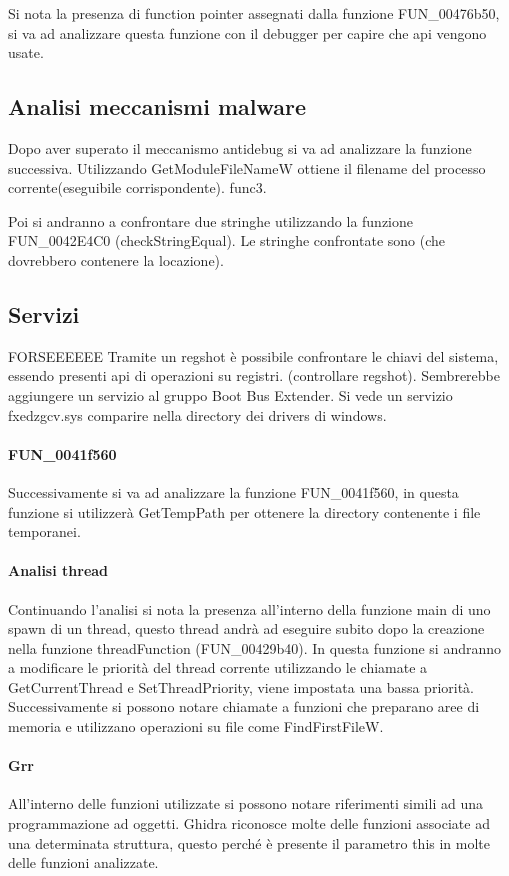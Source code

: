 \documentclass[]{article}
\begin{document}
Si nota la presenza di function pointer assegnati dalla funzione FUN\_00476b50, si va ad analizzare questa funzione con il debugger per capire che api vengono usate. 


\subsection{Analisi meccanismi malware}
Dopo aver superato il meccanismo antidebug si va ad analizzare la funzione successiva. Utilizzando GetModuleFileNameW ottiene il filename del processo corrente(eseguibile corrispondente). func3.

Poi si andranno a confrontare due stringhe utilizzando la funzione FUN\_0042E4C0 (checkStringEqual). Le stringhe confrontate sono (che dovrebbero contenere la locazione). 

\subsection{Servizi} FORSEEEEEE
Tramite un regshot è possibile confrontare le chiavi del sistema, essendo presenti api di operazioni su registri. (controllare regshot). Sembrerebbe aggiungere un servizio al gruppo Boot Bus Extender. Si vede un servizio fxedzgcv.sys comparire nella directory dei drivers di windows. 

\paragraph{FUN\_0041f560}
Successivamente si va ad analizzare la funzione FUN\_0041f560, in questa funzione si utilizzerà GetTempPath per ottenere la directory contenente i file temporanei. 

\paragraph{Analisi thread}
Continuando l'analisi si nota la presenza all'interno della funzione main di uno spawn di un thread, questo thread andrà ad eseguire subito dopo la creazione nella funzione threadFunction (FUN\_00429b40).  In questa funzione si andranno a modificare le priorità del thread corrente utilizzando le chiamate a GetCurrentThread e SetThreadPriority, viene impostata una bassa priorità. Successivamente si possono notare chiamate a funzioni che preparano aree di memoria e utilizzano operazioni su file come FindFirstFileW.

\paragraph{Grr}
All'interno delle funzioni utilizzate si possono notare riferimenti simili ad una programmazione ad oggetti. Ghidra riconosce molte delle funzioni associate ad una determinata struttura, questo perché è presente il parametro this in molte delle funzioni analizzate. 
\end{document}
